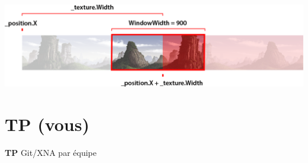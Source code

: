 \documentclass[12pt]{beamer}
\begin{document}
\begin{frame}
    \begin{center}
        \vspace{1cm} 
        \includegraphics[scale=0.26]{img/bg2.png}
    \end{center}
\end{frame}

\section{TP (vous)}

\begingroup
{}
\begin{frame}
    \begin{center}
        \vspace{1cm}
        {\Large\color{background} \textbf{TP} Git/XNA par équipe}
    \end{center}
\end{frame}
\endgroup
\end{document}
